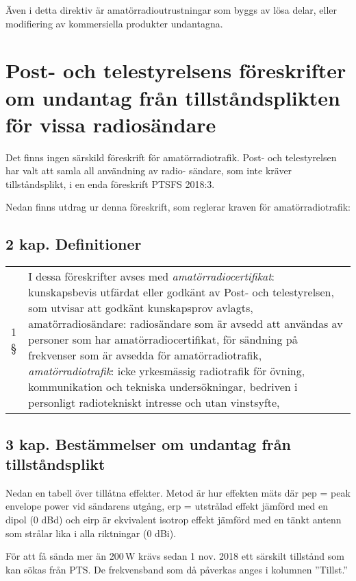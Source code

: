 Även i detta direktiv är amatörradioutrustningar som byggs av lösa delar, eller
modifiering av kommersiella produkter undantagna.

\section{Post- och telestyrelsens föreskrifter
	om undantag från tillståndsplikten
	för vissa radiosändare}

Det finns ingen särskild föreskrift för
amatörradiotrafik. Post- och telestyrelsen
har valt att samla all användning av radio-
sändare, som inte kräver tillståndsplikt, i en
enda föreskrift PTSFS 2018:3.

Nedan finns utdrag ur denna föreskrift,
som reglerar kraven för amatörradiotrafik:

\subsection{2 kap. Definitioner}

\begin{tabularx}{\columnwidth}{lX}
	1 § & I dessa föreskrifter avses med
	\textit{amatörradiocertifikat}: kunskapsbevis utfärdat eller godkänt av Post- och telestyrelsen, som utvisar att godkänt kunskapsprov avlagts,
	amatörradiosändare: radiosändare som är avsedd att användas av personer
	som har amatörradiocertifikat, för sändning på frekvenser som är avsedda för
	amatörradiotrafik, \textit{amatörradiotrafik}: icke yrkesmässig radiotrafik för övning, kommunikation
	och tekniska undersökningar, bedriven i personligt radiotekniskt intresse och utan
	vinstsyfte,\vspace{1ex}\\
\end{tabularx}

\subsection{3 kap. Bestämmelser om undantag från tillståndsplikt}

Nedan en tabell över tillåtna effekter. Metod är hur effekten mäts där pep = peak envelope power vid sändarens utgång, erp = utstrålad effekt jämförd med en dipol (0 dBd) och eirp är ekvivalent isotrop effekt jämförd med en tänkt antenn som strålar lika i alla riktningar (0 dBi).

För att få sända mer än 200\,W krävs sedan 1 nov. 2018 ett särskilt tillstånd som kan sökas från PTS. De frekvensband som då påverkas anges i kolumnen ''Tillst.''

